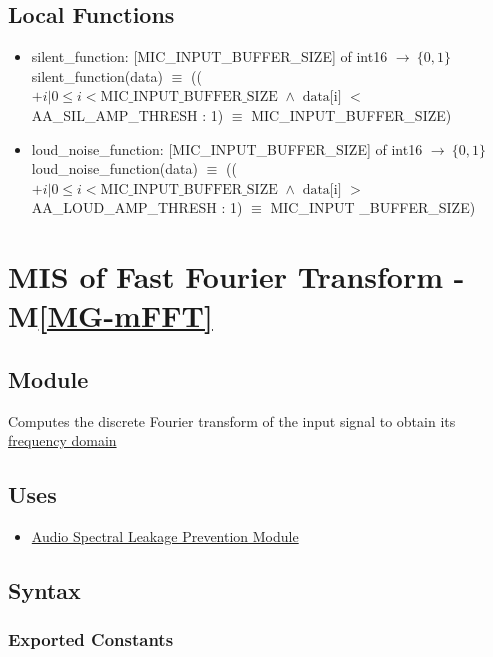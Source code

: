 \documentclass[12pt, titlepage]{article}
\newcommand{\mref}[1]{M\ref{#1}}
\begin{document}
\subsection{Local Functions}
\begin{itemize}
  \item silent\_function: [MIC\_INPUT\_BUFFER\_SIZE] of int16 \(\rightarrow\
  \{0, 1\}\)\\
  silent\_function(data) \(\equiv\) ((\(+ i \vert 0 \le i <
  \text{MIC\_INPUT\_BUFFER\_SIZE } \wedge \text{ data[i] } < \)
  \\AA\_SIL\_AMP\_THRESH : 1) \( \equiv \) MIC\_INPUT\_BUFFER\_SIZE)
  \item loud\_noise\_function: [MIC\_INPUT\_BUFFER\_SIZE] of int16
  \(\rightarrow\ \{0, 1\}\)\\
  loud\_noise\_function(data) \(\equiv\) ((\(+ i \vert 0 \le i <
  \text{MIC\_INPUT\_BUFFER\_SIZE } \wedge \text{ data[i] } > \)
  AA\_LOUD\_AMP\_THRESH : 1) \( \equiv \) MIC\_INPUT \_BUFFER\_SIZE)

\end{itemize}

\newpage
\section{MIS of Fast Fourier Transform - \mref{MG-mFFT}} \label{mod:FFT}

\subsection{Module}

Computes the discrete Fourier transform of the input signal to obtain its
\hyperref[SRS-def:frequency_domain]{frequency domain}

\subsection{Uses}

\begin{itemize}
  \item \hyperref[mod:AudioSpectralLeakage]{Audio Spectral Leakage Prevention
    Module}
\end{itemize}

\subsection{Syntax}

\subsubsection{Exported Constants}
\end{document}

